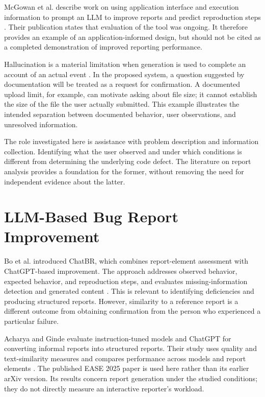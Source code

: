 McGowan et al. describe work on using application interface and execution information to prompt an LLM to improve reports and predict reproduction steps \cite{mcgowan2023}. Their publication states that evaluation of the tool was ongoing. It therefore provides an example of an application-informed design, but should not be cited as a completed demonstration of improved reporting performance.

Hallucination is a material limitation when generation is used to complete an account of an actual event \cite{ji2023}. In the proposed system, a question suggested by documentation will be treated as a request for confirmation. A documented upload limit, for example, can motivate asking about file size; it cannot establish the size of the file the user actually submitted. This example illustrates the intended separation between documented behavior, user observations, and unresolved information.

The role investigated here is assistance with problem description and information collection. Identifying what the user observed and under which conditions is different from determining the underlying code defect. The literature on report analysis provides a foundation for the former, without removing the need for independent evidence about the latter.

\section{LLM-Based Bug Report Improvement}

Bo et al. introduced ChatBR, which combines report-element assessment with ChatGPT-based improvement. The approach addresses observed behavior, expected behavior, and reproduction steps, and evaluates missing-information detection and generated content \cite{chatbr2024}. This is relevant to identifying deficiencies and producing structured reports. However, similarity to a reference report is a different outcome from obtaining confirmation from the person who experienced a particular failure.

Acharya and Ginde evaluate instruction-tuned models and ChatGPT for converting informal reports into structured reports. Their study uses quality and text-similarity measures and compares performance across models and report elements \cite{acharya2025}. The published EASE 2025 paper is used here rather than its earlier arXiv version. Its results concern report generation under the studied conditions; they do not directly measure an interactive reporter's workload.

